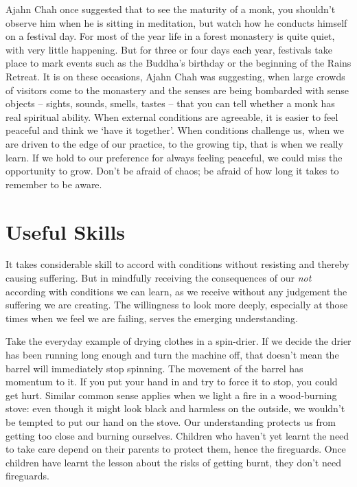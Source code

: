Ajahn Chah once suggested that to see the maturity of a monk, you
shouldn’t observe him when he is sitting in meditation, but watch how he
conducts himself on a festival day. For most of the year life in a
forest monastery is quite quiet, with very little happening. But for
three or four days each year, festivals take place to mark events such
as the Buddha’s birthday or the beginning of the Rains Retreat. It is on
these occasions, Ajahn Chah was suggesting, when large crowds of
visitors come to the monastery and the senses are being bombarded with
sense objects – sights, sounds, smells, tastes – that you can tell
whether a monk has real spiritual ability. When external conditions are
agreeable, it is easier to feel peaceful and think we ‘have it
together’. When conditions challenge us, when we are driven to the edge
of our practice, to the growing tip, that is when we really learn. If we
hold to our preference for always feeling peaceful, we could miss the
opportunity to grow. Don’t be afraid of chaos; be afraid of how long it
takes to remember to be aware.

\section{Useful Skills}

It takes considerable skill to accord with conditions without resisting
and thereby causing suffering. But in mindfully receiving the
consequences of our \emph{not} according with conditions we can learn, as we
receive without any judgement the suffering we are creating. The
willingness to look more deeply, especially at those times when we feel
we are failing, serves the emerging understanding.

Take the everyday example of drying clothes in a spin-drier. If we
decide the drier has been running long enough and turn the machine off,
that doesn’t mean the barrel will immediately stop spinning. The
movement of the barrel has momentum to it. If you put your hand in and
try to force it to stop, you could get hurt. Similar common sense
applies when we light a fire in a wood-burning stove: even though it
might look black and harmless on the outside, we wouldn’t be tempted to
put our hand on the stove. Our understanding protects us from getting
too close and burning ourselves. Children who haven’t yet learnt the
need to take care depend on their parents to protect them, hence the
fireguards. Once children have learnt the lesson about the risks of
getting burnt, they don’t need fireguards.

